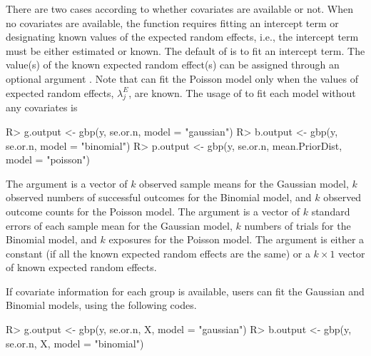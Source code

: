 \documentclass[article]{jss}
\begin{document}
There are two cases according to whether covariates are available or not. When no covariates are available, the function  requires fitting an intercept term  or designating known values of   the expected random effects, i.e., the intercept term must be either estimated or known. The default of   is to fit an intercept term. The value(s) of the known expected random effect(s) can be assigned through an optional argument . Note that  can fit the Poisson model only when the values of expected random effects, $\lambda^E_j$, are known. The usage of  to  fit each model without any covariates is 
\begin{CodeChunk}
\begin{CodeInput}
R> g.output <- gbp(y, se.or.n, model = "gaussian")
R> b.output <- gbp(y, se.or.n, model = "binomial")
R> p.output <- gbp(y, se.or.n, mean.PriorDist, model = "poisson")
\end{CodeInput}
\end{CodeChunk}

The argument  is a vector of $k$ observed sample means  for the Gaussian model, $k$ observed numbers of successful outcomes for the Binomial model, and $k$ observed outcome counts  for the Poisson model. The argument   is a vector of $k$ standard errors of each sample mean for the Gaussian model, $k$ numbers of trials for the Binomial model, and $k$ exposures for the Poisson model. The argument  is either a constant (if all the known expected random effects are the same) or a $k\times1$ vector of known expected random effects.


If covariate information for each group is available, users can fit the Gaussian and Binomial models, using the following codes.
\begin{CodeChunk}
\begin{CodeInput}
R> g.output <- gbp(y, se.or.n, X, model = "gaussian")
R> b.output <- gbp(y, se.or.n, X, model = "binomial")
\end{CodeInput}
\end{CodeChunk}
\end{document}
